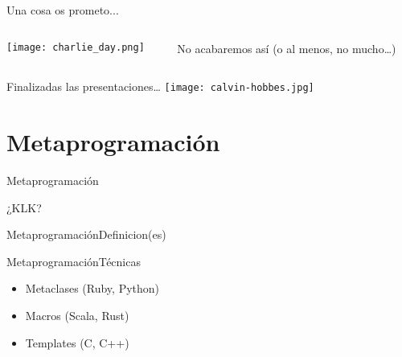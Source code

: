 \documentclass[14pt,aspectratio=169]{beamer}
\begin{document}
\begin{frame}{Una cosa os prometo...}
  \begin{columns}
    \begin{column}{0.5\textwidth}
      \centering
      \texttt{[image: charlie\_day.png]}
    \end{column}

    \begin{column}{0.5\textwidth}
      No acabaremos así (o al menos, no mucho\dots)
    \end{column}
  \end{columns}
\end{frame}

\begin{frame}{Finalizadas las presentaciones\dots}
  \texttt{[image: calvin-hobbes.jpg]}
\end{frame}

\section{Metaprogramación}
\begin{frame}{Metaprogramación}
  \begin{center}
    \Huge ¿KLK?
    \end{center}
\end{frame}

\begin{frame}{Metaprogramación}{Definicion(es)}
\end{frame}

\begin{frame}{Metaprogramación}{Técnicas}
  \begin{itemize}
    \item Metaclases (Ruby, Python)
    \item Macros (Scala, Rust)
    \item Templates (C, C++)
  \end{itemize}
\end{frame}
\end{document}
